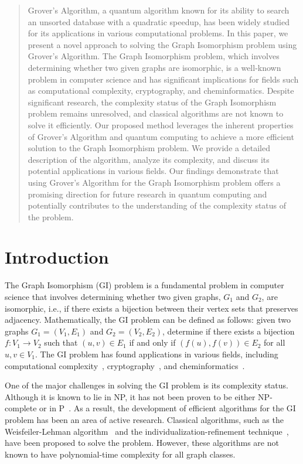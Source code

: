 \begin{abstract}
Grover's Algorithm, a quantum algorithm known for its ability to search an unsorted database with a quadratic speedup, has been widely studied for its applications in various computational problems. In this paper, we present a novel approach to solving the Graph Isomorphism problem using Grover's Algorithm. The Graph Isomorphism problem, which involves determining whether two given graphs are isomorphic, is a well-known problem in computer science and has significant implications for fields such as computational complexity, cryptography, and cheminformatics. Despite significant research, the complexity status of the Graph Isomorphism problem remains unresolved, and classical algorithms are not known to solve it efficiently. Our proposed method leverages the inherent properties of Grover's Algorithm and quantum computing to achieve a more efficient solution to the Graph Isomorphism problem. We provide a detailed description of the algorithm, analyze its complexity, and discuss its potential applications in various fields. Our findings demonstrate that using Grover's Algorithm for the Graph Isomorphism problem offers a promising direction for future research in quantum computing and potentially contributes to the understanding of the complexity status of the problem.
\end{abstract}

\section{Introduction}
The Graph Isomorphism (GI) problem is a fundamental problem in computer science that involves determining whether two given graphs, $G_1$ and $G_2$, are isomorphic, i.e., if there exists a bijection between their vertex sets that preserves adjacency. Mathematically, the GI problem can be defined as follows: given two graphs $G_1 = (V_1, E_1)$ and $G_2 = (V_2, E_2)$, determine if there exists a bijection $f: V_1 \rightarrow V_2$ such that $(u, v) \in E_1$ if and only if $(f(u), f(v)) \in E_2$ for all $u, v \in V_1$. The GI problem has found applications in various fields, including computational complexity~\cite{complexity}, cryptography~\cite{cryptography}, and cheminformatics~\cite{cheminformatics}.

One of the major challenges in solving the GI problem is its complexity status. Although it is known to lie in NP, it has not been proven to be either NP-complete or in P~\cite{classification}. As a result, the development of efficient algorithms for the GI problem has been an area of active research. Classical algorithms, such as the Weisfeiler-Lehman algorithm~\cite{weisfeiler-lehman} and the individualization-refinement technique~\cite{individualization-refinement}, have been proposed to solve the problem. However, these algorithms are not known to have polynomial-time complexity for all graph classes.

